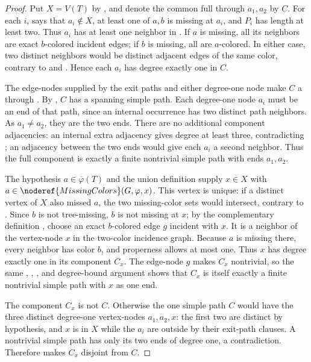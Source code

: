 \begin{proof}
Put $X=V(T)$ by , and denote the common
full  through $a_1,a_2$ by $C$.  For each
$i$,  says that $a_i\notin X$, at least one of
$a,b$ is missing at $a_i$, and $P_i$ has length at least two.  Thus
$a_i$ has at least one neighbor in .  If
$a$ is missing, all its neighbors are exact $b$-colored incident edges;
if $b$ is missing, all are $a$-colored.  In either case, two distinct
neighbors would be distinct adjacent edges of the same color, contrary
to  and .  Hence
each $a_i$ has degree exactly one in $C$.

The edge-nodes supplied by the exit paths and either degree-one node make
$C$ a  through
.  By
, $C$ has a spanning simple path.
Each degree-one node $a_i$ must be an end of that path, since an internal
occurrence has two distinct path neighbors.  As $a_1\ne a_2$, they are
the two ends.
There are no additional component adjacencies: an internal extra
adjacency gives degree at least three, contradicting
; an adjacency between the two
ends would give each $a_i$ a second neighbor.  Thus the full component is
exactly a finite nontrivial simple path with ends $a_1,a_2$.

The hypothesis $a\in\overline\varphi(T)$ and the union definition
 supply $x\in X$ with
$a\in\noderef{MissingColors}(G,\varphi,x)$.  This vertex is unique: if a
distinct vertex of $X$ also missed $a$, the two missing-color sets would
intersect, contrary to .  Since $b$
is not tree-missing, $b$ is not missing at $x$; by the complementary
definition , choose an exact $b$-colored edge $g$
incident with $x$.  It is a neighbor of the vertex-node $x$ in the
two-color incidence graph.  Because $a$ is missing there, every neighbor
has color $b$, and properness allows at most one.  Thus $x$ has degree
exactly one in its component $C_x$.  The edge-node $g$ makes $C_x$
nontrivial, so the same
,
,
, and degree-bound argument shows
that $C_x$ is itself exactly a finite nontrivial simple path with $x$ as
one end.

The component $C_x$ is not $C$.  Otherwise the one simple path $C$ would
have the three distinct degree-one vertex-nodes $a_1,a_2,x$: the first
two are distinct by hypothesis, and $x$ is in $X$ while the $a_i$ are
outside by their exit-path clauses.  A nontrivial simple path has only
its two ends of degree one, a contradiction.  Therefore
 makes $C_x$ disjoint from $C$.


\end{proof}
